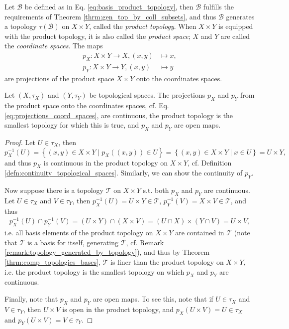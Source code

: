 \begin{defn}\label{defn:product_topology}
	Let $\mathscr B$ be defined as in Eq. \ref{eq:basis_product_topology}, then $\mathscr B$ fulfills the requirements of Theorem \ref{thrm:gen_top_by_coll_subsets}, and thus $\mathscr B$ generates a topology $\tau(\mathscr B)$ on $X\times Y$, called the \textit{product topology}. When $X \times Y$ is equipped with the product topology, it is also called the \textit{product space}; $X$ and $Y$ are called the \textit{coordinate spaces}. The maps
	\begin{equation}
		\begin{aligned}
			p_X: X\times Y\to X, (x, y) &\mapsto x, \label{eq:projections_coord_spaces} 
			\\ p_Y: X\times Y\to Y, (x, y)&\mapsto y
		\end{aligned}
	\end{equation}
	are projections of the product space $X\times Y$ onto the coordinates spaces.
\end{defn}

\begin{theorem}
	Let $(X, \tau_X)$ and $(Y, \tau_Y)$ be topological spaces. The projections $p_X$ and $p_Y$ from the product space onto the coordinates spaces, cf. Eq. \eqref{eq:projections_coord_spaces}, are continuous, the product topology is the smallest topology for which this is true, and $p_X$ and $p_Y$ are open maps.
\end{theorem}

\begin{proof}
	Let $U\in \tau_X$, then $$p_X^{-1}(U) = \left\{(x, y)\in X\times Y \mid p_X((x, y))\in U\right\} = \left\{(x, y)\in X\times Y \mid x\in U\right\} = U\times Y,$$ and thus $p_X$ is continuous in the product topology on $X\times Y$, cf. Definition \ref{defn:continuity_topological_spaces}. Similarly, we can show the continuity of $p_Y$.
	
	Now suppose there is a topology $\mathscr T$ on $X\times Y$ s.t. both $p_X$ and $p_Y$ are continuous. Let $U\in \tau_X$ and $V\in\tau_Y$, then $p_X^{-1}(U) = U\times Y\in \mathscr T$, $p_Y^{-1}(V) = X\times V\in \mathscr T$, and thus
	\begin{align}\label{eq:intersection_of_preimage_of_projs}
		p_X^{-1}(U) \cap p_Y^{-1}(V) = (U\times Y)\cap (X\times V) = (U\cap X) \times (Y\cap V) = U\times V,
	\end{align}
	i.e. all basis elements of the product topology on $X\times Y$ are contained in $\mathscr T$ (note that $\mathscr T$ is a basis for itself, generating $\mathscr T$, cf. Remark \ref{remark:topology_generated_by_topology}), and thus by Theorem \ref{thrm:comp_topologies_bases}, $\mathscr T$ is finer than the product topology on $X\times Y$, i.e. the product topology is the smallest topology on which $p_X$ and $p_Y$ are continuous.
	
	Finally, note that $p_X$ and $p_Y$ are open maps. To see this, note that if $U\in\tau_X$ and $V\in\tau_Y$, then $U\times V$ is open in the product topology, and $p_X(U\times V) = U\in\tau_X$ and $p_Y(U\times V) = V\in\tau_Y$.
\end{proof}


